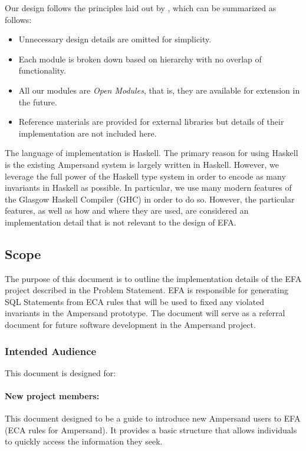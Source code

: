 \documentclass[12pt, svgnames]{article}
\let\Oldsubsection\subsection
\renewcommand{\subsection}{\FloatBarrier\Oldsubsection}
\let\Oldsubsubsection\subsubsection
\renewcommand{\subsubsection}{\FloatBarrier\Oldsubsubsection}
\begin{document}
Our design follows the principles laid out by \citep{modStruct}, which can be summarized as follows:
\begin{itemize}
\item Unnecessary design details are omitted for simplicity.
\item Each module is broken down based on hierarchy with no overlap of functionality.
\item All our modules are \emph{Open Modules}, that is, they are available for extension in the future.
\item Reference materials are provided for external libraries but details of
  their implementation are not included here. 
\end{itemize}

The language of implementation is Haskell. The primary reason for using Haskell
is the existing Ampersand system is largely written in Haskell. However, we
leverage the full power of the Haskell type system in order to encode as many
invariants in Haskell as possible. In particular, we use many modern features of
the Glasgow Haskell Compiler (GHC) in order to do so. However, the particular
features, as well as how and where they are used, are considered an
implementation detail that is not relevant to the design of EFA.

\subsection{Scope}
The purpose of this document is to outline the implementation details of the 
EFA project described in the Problem Statement.
EFA is responsible for generating SQL Statements from ECA rules that will 
be used to fixed any violated invariants in the Ampersand prototype. 
The document will serve as a referral document for future software development in the Ampersand project.

\subsubsection{Intended Audience}
This document is designed for:
\paragraph{New project members:}
This document designed to be a guide to introduce new Ampersand users to EFA 
(ECA rules for Ampersand). It provides a basic structure that allows 
individuals to quickly access the information they seek.
   
\end{document}
